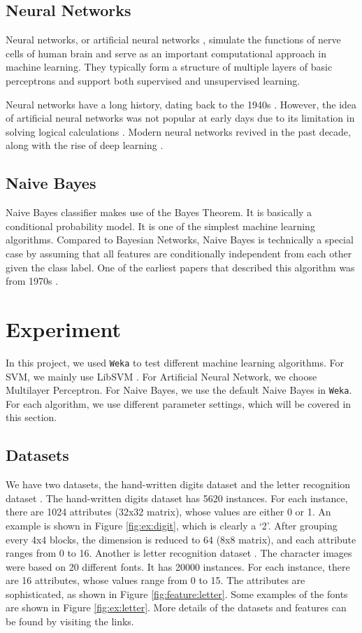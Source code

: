 \documentclass[11pt]{article}
\begin{document}
\subsection{Neural Networks}
Neural networks, or artificial neural networks \cite{hagan1996neural}, simulate the functions of nerve cells of human brain and serve as an important computational approach in machine learning. They typically form a structure of multiple layers of basic perceptrons and support both supervised and unsupervised learning.

Neural networks have a long history, dating back to the 1940s \cite{mcculloch1943logical}. However, the idea of artificial neural networks was not popular at early days due to its limitation in solving logical calculations \cite{minsky1988perceptrons}. Modern neural networks revived in the past decade, along with the rise of deep learning \cite{bengio2009learning, schmidhuber2015deep}.

\subsection{Naive Bayes}
Naive Bayes classifier makes use of the Bayes Theorem. It is basically a conditional probability model. It is one of the simplest machine learning algorithms. Compared to Bayesian Networks, Naive Bayes is technically a special case by assuming that all features are conditionally independent from each other given the class label. One of the earliest papers that described this algorithm was from 1970s \cite{duda1973pattern}. 

\section{Experiment}\label{exp}
In this project, we used \texttt{Weka} \cite{hall2009weka} to test different machine learning algorithms. For SVM, we mainly use LibSVM \cite{Chang2001}. For Artificial Neural Network, we choose Multilayer Perceptron. For Naive Bayes, we use the default Naive Bayes in \texttt{Weka}. For each algorithm, we use different parameter settings, which will be covered in this section.

\subsection{Datasets}
We have two datasets, the hand-written digits dataset \cite{digitdataset} and the letter recognition dataset \cite{letterdataset}. The hand-written digits dataset has 5620 instances. For each instance, there are 1024 attributes (32x32 matrix), whose values are either 0 or 1. An example is shown in Figure \ref{fig:ex:digit}, which is clearly a `2'. After grouping every 4x4 blocks, the dimension is reduced to 64 (8x8 matrix), and each attribute ranges from 0 to 16. Another is letter recognition dataset \cite{letterdataset}. The character images were based on 20 different fonts. It has 20000 instances. For each instance, there are 16 attributes, whose values range from 0 to 15. The attributes are sophisticated, as shown in Figure \ref{fig:feature:letter}. Some examples of the fonts are shown in Figure \ref{fig:ex:letter}. More details of the datasets and features can be found by visiting the links.
\end{document}
